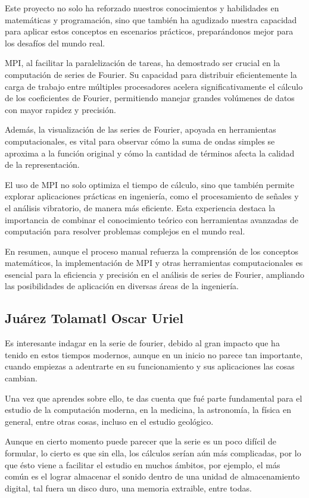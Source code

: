 Este proyecto no solo ha reforzado nuestros conocimientos y habilidades en matemáticas y programación, sino que también ha agudizado nuestra capacidad para aplicar estos conceptos en escenarios prácticos, preparándonos mejor para los desafíos del mundo real.

MPI, al facilitar la paralelización de tareas, ha demostrado ser crucial en la computación de series de Fourier. Su capacidad para distribuir eficientemente la carga de trabajo entre múltiples procesadores acelera significativamente el cálculo de los coeficientes de Fourier, permitiendo manejar grandes volúmenes de datos con mayor rapidez y precisión.

Además, la visualización de las series de Fourier, apoyada en herramientas computacionales, es vital para observar cómo la suma de ondas simples se aproxima a la función original y cómo la cantidad de términos afecta la calidad de la representación. 

El uso de MPI no solo optimiza el tiempo de cálculo, sino que también permite explorar aplicaciones prácticas en ingeniería, como el procesamiento de señales y el análisis vibratorio, de manera más eficiente. Esta experiencia destaca la importancia de combinar el conocimiento teórico con herramientas avanzadas de computación para resolver problemas complejos en el mundo real.

En resumen, aunque el proceso manual refuerza la comprensión de los conceptos matemáticos, la implementación de MPI y otras herramientas computacionales es esencial para la eficiencia y precisión en el análisis de series de Fourier, ampliando las posibilidades de aplicación en diversas áreas de la ingeniería.

\subsection{Juárez Tolamatl Oscar Uriel}

Es interesante indagar en la serie de fourier, debido al gran impacto que ha tenido en estos tiempos modernos, aunque en un inicio no parece tan importante, cuando empiezas a adentrarte en su funcionamiento y sus aplicaciones las cosas cambian.

Una vez que aprendes sobre ello, te das cuenta que fué parte fundamental para el estudio de la computación moderna, en la medicina, la astronomía, la física en general, entre otras cosas, incluso en el estudio geológico.

Aunque en cierto momento puede parecer que la serie es un poco difícil de formular, lo cierto es que sin ella, los cálculos serían aún más complicadas, por lo que ésto viene a facilitar el estudio en muchos ámbitos, por ejemplo, el más común es el lograr almacenar el sonido dentro de una unidad de almacenamiento digital, tal fuera un disco duro, una memoria extraible, entre todas.

